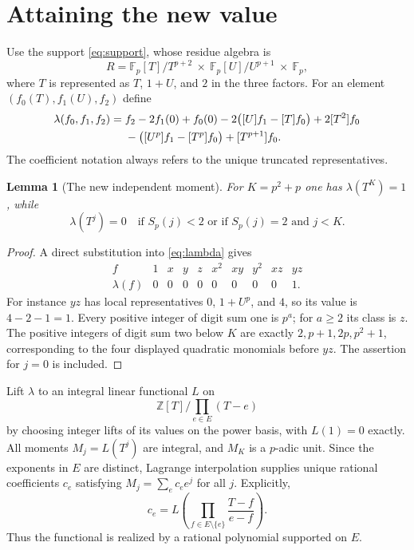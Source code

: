 \documentclass[11pt]{article}
\newtheorem{lemma}[theorem]{Lemma}
\theoremstyle{remark}\newtheorem{remark}[theorem]{Remark}
\newcommand{\Z}{\mathbb Z}\newcommand{\Fp}{\mathbb F_p}\newcommand{\Zp}{\mathbb Z_p}\newcommand{\Qp}{\mathbb Q_p}\newcommand{\Cp}{\mathbb C_p}
\begin{document}
\section{Attaining the new value}
Use the support \eqref{eq:support}, whose residue algebra is
\[
 R=\Fp[T]/T^{p+2}\ \times\ \Fp[U]/U^{p+1}\ \times\ \Fp,
\]
where $T$ is represented as $T$, $1+U$, and $2$ in the three factors. For an element $(f_0(T),f_1(U),f_2)$ define
\begin{align}
 \lambda(f_0,f_1,f_2)
 ={}&f_2-2f_1(0)+f_0(0)
 -2\bigl([U]f_1-[T]f_0\bigr)+2[T^2]f_0\notag\\
 &-\bigl([U^p]f_1-[T^p]f_0\bigr)+[T^{p+1}]f_0.
 \label{eq:lambda}
\end{align}
The coefficient notation always refers to the unique truncated representatives.

\begin{lemma}[The new independent moment]\label{lem:moment}
For $K=p^2+p$ one has $\lambda(T^K)=1$, while
\[
 \lambda(T^j)=0
 \quad\text{if }S_p(j)<2\text{ or if }S_p(j)=2\text{ and }j<K.
\]
\end{lemma}
\begin{proof}
A direct substitution into \eqref{eq:lambda} gives
\[
\begin{array}{c|rrrrrrrrr}
 f&1&x&y&z&x^2&xy&y^2&xz&yz\\\hline
 \lambda(f)&0&0&0&0&0&0&0&0&1.
\end{array}
\]
For instance $yz$ has local representatives $0$, $1+U^p$, and $4$, so its value is $4-2-1=1$. Every positive integer of digit sum one is $p^a$; for $a\ge2$ its class is $z$. The positive integers of digit sum two below $K$ are exactly $2,p+1,2p,p^2+1$, corresponding to the four displayed quadratic monomials before $yz$. The assertion for $j=0$ is included.
\end{proof}

Lift $\lambda$ to an integral linear functional $L$ on
\[
 \Z[T]\big/\prod_{e\in E}(T-e)
\]
by choosing integer lifts of its values on the power basis, with $L(1)=0$ exactly. All moments $M_j=L(T^j)$ are integral, and $M_K$ is a $p$-adic unit. Since the exponents in $E$ are distinct, Lagrange interpolation supplies unique rational coefficients $c_e$ satisfying $M_j=\sum_e c_ee^j$ for all $j$. Explicitly,
\begin{equation}\label{eq:lagrange}
 c_e=L\left(\prod_{f\in E\setminus\{e\}}\frac{T-f}{e-f}\right).
\end{equation}
Thus the functional is realized by a rational polynomial supported on $E$.
\end{document}

